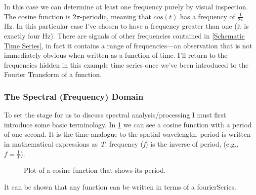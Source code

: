 \documentclass[american, twoside]{article}
\begin{document}
In this case we can determine at least one \gls{frequency} purely by visual inspection. The cosine function is $2\pi$-\gls{period}ic, meaning that $cos(t)$ has a \gls{frequency} of
$\frac{1}{2\pi}$ Hz. In this particular case I've chosen to have a \gls{frequency} greater than one (it is exactly four Hz). There are signals of other frequencies contained
in \cref{Schematic Time Series}, in fact it contains a range of frequencies---an observation that is not immediately obvious when written as a function of time.
I'll return to the frequencies hidden in this example time series once we've been introduced to the Fourier Transform of a function.

\subsubsection{The Spectral (Frequency) Domain} \label{Background:Math:Spectral}
To set the stage for us to discuss spectral analysis/processing I must first introduce some basic terminology. In \cref{figure2} we can see a cosine function with a \gls{period}
of one second. It is the time-analogue to the spatial \gls{wavelength}. \Gls{period} is written in mathematical expressions as \textit{T}. \Gls{frequency} (\textit{f}) is the inverse of \gls{period},
(e.g., $f=\frac{1}{T}$).

\begin{center}
    \begin{figure}[ht]
        \caption[Cosine Function]{Plot of a cosine function that shows its period.} \label{figure2}
    \end{figure}
\end{center}
It can be shown that any function can be written in terms of a \gls{fourierSeries}.
\end{document}
